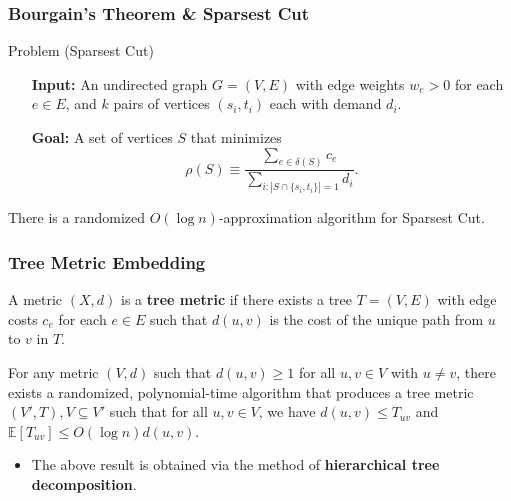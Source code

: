 \documentclass{beamer}
\newcommand{\EE}{\mathbb{E}}
\begin{document}
    \begin{frame}
        \frametitle{Bourgain's Theorem \& {\sc Sparsest Cut}}

        \begin{block}{Problem ({\sc Sparsest Cut})}
            \setlength{\leftmargini}{3.25em}
            \begin{itemize}
                \item[\bf Input:] An undirected graph $G = (V, E)$ with edge weights $w_e > 0$ for each $e \in E$, and $k$ pairs of vertices $(s_i, t_i)$ each with demand $d_i$.
                \item[\bf Goal:] A set of vertices $S$ that minimizes
                $$ \rho(S) \equiv \frac{\sum_{e \in \delta(S)} c_e}{\sum_{i : |S \cap \{ s_i, t_i \}| = 1} d_i}. $$
            \end{itemize}
        \end{block}

        \pause

        \begin{corollary}
            There is a randomized $O(\log n)$-approximation algorithm for {\sc Sparsest Cut}.
        \end{corollary}
    \end{frame}

    \begin{frame}
        \frametitle{Tree Metric Embedding}
    
        \begin{definition}
            A metric $(X, d)$ is a {\bf tree metric} if there exists a tree $T = (V, E)$ with edge costs $c_e$ for each $e \in E$ such that $d(u, v)$ is the cost of the unique path from $u$ to $v$ in $T$.
        \end{definition}

        \pause

        \begin{theorem}
            For any metric $(V, d)$ such that $d(u, v) \geq 1$ for all $u, v \in V$ with $u \neq v$, there exists a randomized, polynomial-time algorithm that produces a tree metric $(V', T), V \subseteq V'$ such that for all $u, v \in V$, we have $d(u, v) \leq T_{uv}$ and $\EE[T_{uv}] \leq O(\log n) d(u, v)$.
        \end{theorem}

        \pause

        \begin{itemize}
            \item The above result is obtained via the method of {\bf hierarchical tree decomposition}.
        \end{itemize}
    \end{frame}
\end{document}
